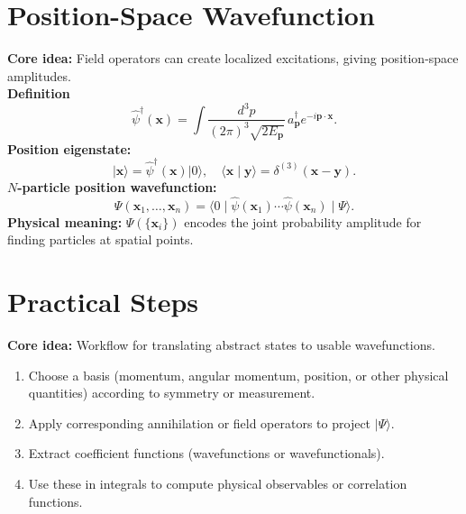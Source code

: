 \documentclass[11pt]{article}
\numberwithin{equation}{section}
\begin{document}
\section{Position-Space Wavefunction}
\textbf{Core idea:} Field operators can create localized excitations, giving position-space amplitudes. \\[1em]
\textbf{Definition}
\begin{equation}
   \hat\psi^\dagger(\mathbf x) = \int \! \frac{d^3p}{(2\pi)^3\sqrt{2E_{\mathbf p}}}\, a_{\mathbf p}^\dagger e^{-i\mathbf p\cdot\mathbf x}.
\end{equation}
\textbf{Position eigenstate:}
\begin{equation}
   \lvert\mathbf x\rangle = \hat\psi^\dagger(\mathbf x)\lvert0\rangle,
   \quad\langle\mathbf x \mid\mathbf y\rangle = \delta^{(3)}(\mathbf x-\mathbf y).
\end{equation}
\textbf{$N$-particle position wavefunction:}
\begin{equation}
   \Psi(\mathbf x_1, \dots, \mathbf x_n) = \langle0\mid\hat\psi(\mathbf x_1)
   \cdots\hat\psi(\mathbf x_n)\mid\Psi\rangle.
\end{equation}
\textbf{Physical meaning:} $\Psi(\{\mathbf x_i\})$ encodes the joint probability 
amplitude for finding particles at spatial points.
\\[1em]

\section{Practical Steps}
\textbf{Core idea:} Workflow for translating abstract states to usable wavefunctions.   \\
\begin{enumerate}
   \item Choose a basis (momentum, angular momentum, position, or other physical quantities) according to symmetry or measurement.
   \item Apply corresponding annihilation or field operators to project $\lvert\Psi\rangle$.
   \item Extract coefficient functions (wavefunctions or wavefunctionals).
   \item Use these in integrals to compute physical observables or correlation functions.
\end{enumerate}
\end{document}
